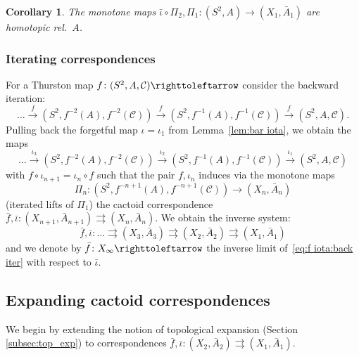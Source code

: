 \documentclass{amsart}
\theoremstyle{plain}
\newtheorem{corollary}[theorem]{Corollary}
\theoremstyle{definition}
\theoremstyle{remark}
\newcommand{\reminder}[1]{\textsl{$\lhd\rhd$#1$\lhd\rhd$}\marginpar{$\lhd\rhd\lhd\rhd\lhd\rhd$}}%
\newcommand{\hide}[1]{}
\newcommand{\CC}{{\mathcal C}}
\newcommand\selfmap{\righttoleftarrow}
\begin{document}
\begin{corollary}
\label{cor:Isot:Pi_1 Pi_0}
The monotone maps $\bar \iota\circ \Pi_2, \Pi_1\colon (S^2,A)\to (X_1,\bar A_1)$ are homotopic rel.\ $A$.
\end{corollary}


\subsubsection{Iterating correspondences}\label{sss: iter_corres}
For a Thurston map $f\colon (S^2,A,\CC)\selfmap$ consider the backward iteration:%
\begin{equation}
\label{eq:f:back iter}
 \dots\overset{f}{\longrightarrow}(S^2,f^{-2}(A),f^{-2}(\CC))\overset{f}{\longrightarrow}(S^2,f^{-1}(A),f^{-1}(\CC))\overset{f}{\longrightarrow} (S^2,A,\CC).
\end{equation}
Pulling back the forgetful map $\iota=\iota_1$ from Lemma~\ref{lem:bar iota}, we obtain the maps
\begin{equation}
\label{eq:iota:back iter}
 \dots\overset{\iota_3}{\longrightarrow}(S^2,f^{-2}(A),f^{-2}(\CC))\overset{\iota_2}{\longrightarrow}(S^2,f^{-1}(A),f^{-1}(\CC))\overset{\iota_1}{\longrightarrow} (S^2,A,\CC)
\end{equation}
with $f\circ \iota_{n+1}=\iota_n\circ f$ such that the pair $f,\iota_n$ induces via the monotone maps
\[ \Pi_n \colon (S^2,f^{-n+1}(A), f^{-n+1}(\CC)) \to (X_n,\bar A_n)\]
(iterated lifts of $\Pi_1$) the cactoid correspondence $\bar f,\bar \iota \colon ( X_{n+1},\bar A_{n+1})\rightrightarrows ( X_{n},\bar A_{n})$. We obtain the inverse system:
\begin{equation}
\label{eq:f iota:back iter}
\bar f,\bar \iota\colon  \dots \rightrightarrows (X_3,\bar A_3)\rightrightarrows (X_2,\bar A_2)\rightrightarrows (X_1,\bar A_1)
\end{equation}
and we denote by $\bar f\colon X_\infty\selfmap$ the inverse limit of~\eqref{eq:f iota:back iter} with respect to $\bar \iota$.  


\subsection{Expanding cactoid correspondences}  We begin by extending the notion of topological expansion (Section \ref{subsec:top_exp}) to correspondences $\bar f,\bar \iota\colon (X_2,\bar A_2)\rightrightarrows (X_1,\bar A_1)$. 
\end{document}
